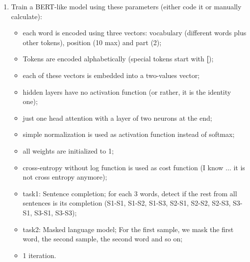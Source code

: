 \documentclass{../extra/aakpract/aakpract}
\begin{document}
\begin{enumerate}
	\item Train a BERT-like model using these parameters (either code it or manually calculate):
	\begin{itemize}
		\item each word is encoded using three vectors: vocabulary (different words plus other tokens), position (10 max) and part (2);
		\item Tokens are encoded alphabetically (special tokens start with \textbf{[});
		\item each of these vectors is embedded into a two-values vector;
		\item hidden layers have no activation function (or rather, it is the identity one);
		\item just one head attention with a layer of two neurons at the end;
		\item simple normalization is used as activation function instead of softmax;
		\item all weights are initialized to 1;
		\item cross-entropy without log function is used as cost function (I know ... it is not cross entropy anymore);
		\item task1: Sentence completion; for each 3 words, detect if the rest from all sentences is its completion (S1-S1, S1-S2, S1-S3, S2-S1, S2-S2, S2-S3, S3-S1, S3-S1, S3-S3); 
		\item task2: Masked language model; For the first sample, we mask the first word, the second sample, the second word and so on;
		\item 1 iteration.
	\end{itemize}
	
\end{enumerate}
\end{document}
